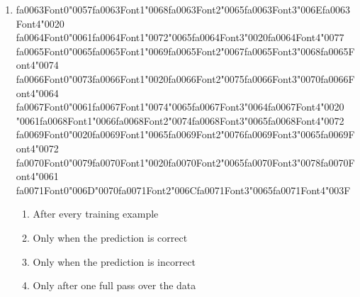 \documentclass[12pt]{article}
\begin{document}
\begin{enumerate}[label=Q\arabic*.]
\item {\csname fa0063Font0\endcsname\char"0057}{\csname fa0063Font1\endcsname\char"0068}{\csname fa0063Font2\endcsname\char"0065}{\csname fa0063Font3\endcsname\char"006E}{\csname fa0063Font4\endcsname\char"0020} {\csname fa0064Font0\endcsname\char"0061}{\csname fa0064Font1\endcsname\char"0072}{\char"0065}{\csname fa0064Font3\endcsname\char"0020}{\csname fa0064Font4\endcsname\char"0077} {\csname fa0065Font0\endcsname\char"0065}{\csname fa0065Font1\endcsname\char"0069}{\csname fa0065Font2\endcsname\char"0067}{\csname fa0065Font3\endcsname\char"0068}{\csname fa0065Font4\endcsname\char"0074} {\csname fa0066Font0\endcsname\char"0073}{\csname fa0066Font1\endcsname\char"0020}{\csname fa0066Font2\endcsname\char"0075}{\csname fa0066Font3\endcsname\char"0070}{\csname fa0066Font4\endcsname\char"0064} {\csname fa0067Font0\endcsname\char"0061}{\csname fa0067Font1\endcsname\char"0074}{\char"0065}{\csname fa0067Font3\endcsname\char"0064}{\csname fa0067Font4\endcsname\char"0020} {\char"0061}{\csname fa0068Font1\endcsname\char"0066}{\csname fa0068Font2\endcsname\char"0074}{\csname fa0068Font3\endcsname\char"0065}{\csname fa0068Font4\endcsname\char"0072} {\csname fa0069Font0\endcsname\char"0020}{\csname fa0069Font1\endcsname\char"0065}{\csname fa0069Font2\endcsname\char"0076}{\csname fa0069Font3\endcsname\char"0065}{\csname fa0069Font4\endcsname\char"0072} {\csname fa0070Font0\endcsname\char"0079}{\csname fa0070Font1\endcsname\char"0020}{\csname fa0070Font2\endcsname\char"0065}{\csname fa0070Font3\endcsname\char"0078}{\csname fa0070Font4\endcsname\char"0061} {\csname fa0071Font0\endcsname\char"006D}{\char"0070}{\csname fa0071Font2\endcsname\char"006C}{\csname fa0071Font3\endcsname\char"0065}{\csname fa0071Font4\endcsname\char"003F}
\begin{enumerate}[label=(\Alph*)]
    \item After every training example
    \item Only when the prediction is correct
    \item Only when the prediction is incorrect
    \item Only after one full pass over the data
\end{enumerate}

\end{enumerate}
\end{document}
